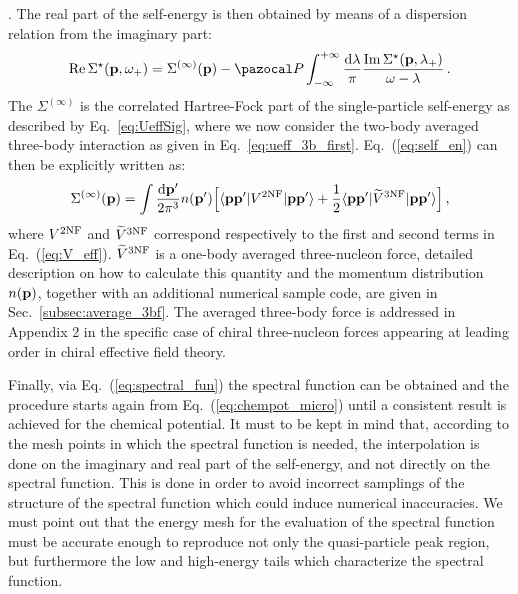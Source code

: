 . The real part of the self-energy is then obtained by means of a dispersion relation from the imaginary part: 
\begin{equation}
{\rm Re} \, \Sigma^\star({\bf p},\omega_+)=\Sigma^{(\infty)}({\bf p})-{\pazocal P}\int_{-\infty}^{+\infty}\frac{{\rm d}{\lambda}}{\pi}\frac{{\rm Im} \, \Sigma^\star({\bf p},\lambda_+)}{\omega-\lambda}\,.
\label{eq:self_en}
\end{equation}
The $\Sigma^{(\infty)}$ is the correlated Hartree-Fock part of the single-particle self-energy as described by Eq.~\eqref{eq:UeffSig}, where we now consider the two-body averaged three-body interaction as given in Eq.~\eqref{eq:ueff_3b_first}. Eq.~(\ref{eq:self_en}) can then be explicitly written as:
\begin{equation}
\label{eq:HF_self}
\Sigma^{(\infty)}({\bf p})=\int\frac{{\rm d}{\bf p'}}{2\pi^3}n({\bf p'})\Big[\langle{\bf pp'}|V^{\rm 2NF}|{\bf pp'}\rangle +\frac{1}{2}\langle{\bf pp'}|\widetilde V^{\rm 3NF}|{\bf pp'}\rangle\Big] \,,
\end{equation}
where $V^{\rm 2NF}$ and $\widetilde V^{\rm 3NF}$ correspond respectively to the first and second terms in Eq.~(\ref{eq:V_eff}). $\widetilde V^{\rm 3NF}$ is a one-body averaged three-nucleon force, detailed description on how to calculate this quantity and the momentum distribution $n({\bf p})$, together with an additional numerical sample code, are given in Sec.~\ref{subsec:average_3bf}. The averaged three-body force is addressed in Appendix 2 in the specific case of chiral three-nucleon forces appearing at leading order in chiral effective field theory.

Finally, via Eq.~(\ref{eq:spectral_fun}) the spectral function can be obtained and the procedure starts again from Eq.~(\ref{eq:chempot_micro}) until a consistent result is achieved for the chemical potential. It must to be kept in mind that, according to the mesh points in which the spectral function is needed, the interpolation is done on the imaginary and real part of the self-energy, and not directly on the spectral function. This is done in order to avoid incorrect samplings of the structure of the spectral function which could induce numerical inaccuracies. We must point out that the energy mesh for the evaluation of the spectral function must be accurate enough to reproduce not only the quasi-particle peak region, but furthermore the low and high-energy tails which characterize the spectral function.   

